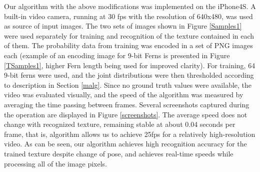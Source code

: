 Our algorithm with the above modifications was implemented on the iPhone4S. A built-in video camera, running at 30 fps with the resolution of 640x480, was used as source of input images. The two sets of images shown in Figure \ref{Samples1} were used separately  for training and recognition of the texture contained in each of them. The probability data from training was encoded in a set of PNG images each (example of an encoding image for 9-bit Ferns is presented in Figure \ref{TSamples1}, higher Fern length being used for improved clarity). For training, 64 9-bit ferns were used, and the joint distributions were then thresholded according to description in Section \ref{malg}. Since no ground truth values were available, the video was evaluated visually, and the speed of the algorithm was measured by averaging the time passing between frames. Several screenshots captured during the operation are displayed in Figure \ref {screenshots}. The average speed does not change with recognized texture, remaining stable at about 0.04 seconds per frame, that is, algorithm allows us to achieve 25fps for a relatively high-resolution video.  As can be seen, our algorithm achieves high recognition accuracy for the trained texture despite change of pose, and achieves real-time speeds while processing all of the image pixels. 













